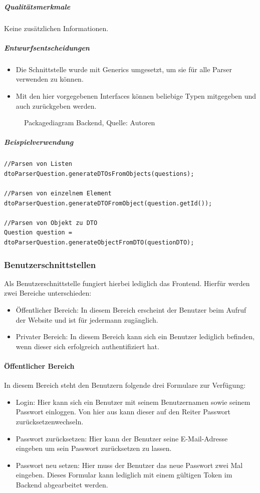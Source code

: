 \subparagraph{Qualitätsmerkmale}
Keine zusätzlichen Informationen.
\subparagraph{Entwurfsentscheidungen}
\begin{itemize}
\item Die Schnittstelle wurde mit Generics umgesetzt, um sie für alle Parser verwenden zu können.
\item Mit den hier vorgegebenen Interfaces können beliebige Typen mitgegeben und auch zurückgeben werden.
\end{itemize}

\begin{figure}[H]
	\centering
	\caption[Packagediagram Backend]{Packagediagram Backend, Quelle: Autoren}
	\label{img: package}
\end{figure}

\subparagraph{Beispielverwendung}
\begin{verbatim}
//Parsen von Listen
dtoParserQuestion.generateDTOsFromObjects(questions);

//Parsen von einzelnem Element
dtoParserQuestion.generateDTOFromObject(question.getId());

//Parsen von Objekt zu DTO
Question question = dtoParserQuestion.generateObjectFromDTO(questionDTO);
\end{verbatim}

\subsubsection{Benutzerschnittstellen}
Als Benutzerschnittstelle fungiert hierbei lediglich das Frontend.
Hierfür werden zwei Bereiche unterschieden:
\begin{itemize}
    \item Öffentlicher Bereich: In diesem Bereich erscheint der Benutzer beim Aufruf der Website und ist für jedermann zugänglich.
    \item Privater Bereich: In diesem Bereich kann sich ein Benutzer lediglich befinden, wenn dieser sich erfolgreich authentifiziert hat.
\end{itemize}

\paragraph{Öffentlicher Bereich}
In diesem Bereich steht den Benutzern folgende drei Formulare zur Verfügung:
\begin{itemize}
    \item Login: Hier kann sich ein Benutzer mit seinem Benutzernamen sowie seinem Passwort einloggen. Von hier aus kann dieser auf den Reiter \glqq Passwort zurücksetzen\grqq wechseln.
    \item Passwort zurücksetzen: Hier kann der Benutzer seine E-Mail-Adresse eingeben um sein Passwort zurücksetzen zu lassen.
    \item Passwort neu setzen: Hier muss der Benutzer das neue Passwort zwei Mal eingeben. Dieses Formular kann lediglich mit einem gültigen Token im Backend abgearbeitet werden.
\end{itemize}
\newpage
